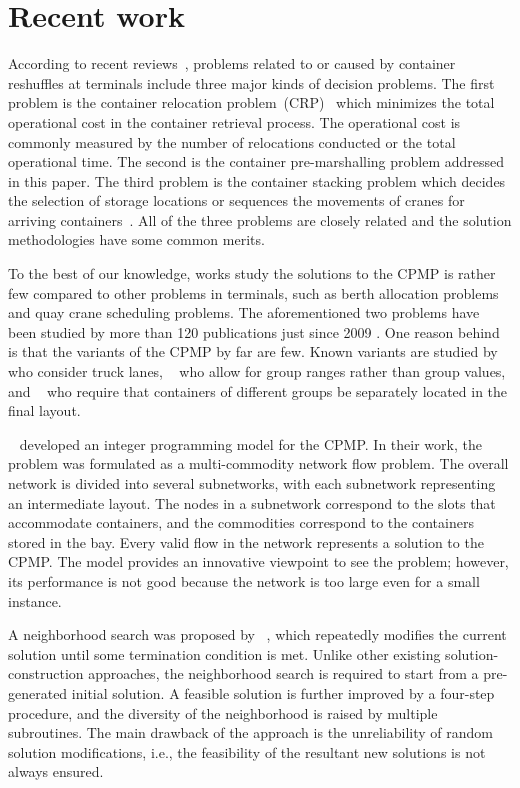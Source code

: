 \documentclass[review,3p,times,12pt,number]{elsarticle}\usepackage{amsmath}\usepackage{amssymb}
\renewcommand{\citet}[1]{\citeauthor{#1}~\citep{#1}}
\begin{document}
\section{Recent work}
\label{sec:literature}
According to recent reviews~\citep{carlo2014,lehnfeld2014}, problems related to or caused by container reshuffles at terminals include three major kinds of decision problems. The first problem is the container relocation problem~(CRP)~\citep{Jovanovic2014achain,jin2015} which minimizes the total operational cost in the container retrieval process. The operational cost is commonly measured by the number of relocations conducted or the total operational time. The second is the container pre-marshalling problem addressed in this paper. The third problem is the container stacking problem which decides the selection of storage locations or sequences the movements of cranes for arriving containers~\citep{Dayama2014}. All of the three problems are closely related and the solution methodologies have some common merits.


To the best of our knowledge, works study the solutions to the CPMP is rather few compared to other problems in terminals, such as berth allocation problems and quay crane scheduling problems. The aforementioned two problems have been studied by more than 120 publications just since 2009 \citep{Bierwirth2015}. One reason behind is that the variants of the CPMP by far are few. Known variants are studied by \citet{wang2015} who consider truck lanes, \citet{rendl2013} who allow for group ranges rather than group values, and \citet{Huang2012} who require that containers of different groups be separately located in the final layout.


\citet{lee2007} developed an integer programming model for the CPMP\@. In their work, the problem was formulated as a multi-commodity network flow problem. The overall network is divided into several subnetworks, with each subnetwork representing an intermediate layout. The nodes in a subnetwork correspond to the slots that accommodate containers, and the commodities correspond to the containers stored in the bay. Every valid flow in the network represents a solution to the CPMP\@. The model provides an innovative viewpoint to see the problem; however, its performance is not good because the network is too large even for a small instance.

A neighborhood search was proposed by \citet{lee2009}, which repeatedly modifies the current solution until some termination condition is met. Unlike other existing solution-construction approaches, the neighborhood search is required to start from a pre-generated initial solution.
A feasible solution is further improved by a four-step procedure, and the diversity of the neighborhood is raised by multiple subroutines. The main drawback of the approach is the unreliability of random solution modifications, i.e., the feasibility of the resultant new solutions is not always ensured.
\end{document}
